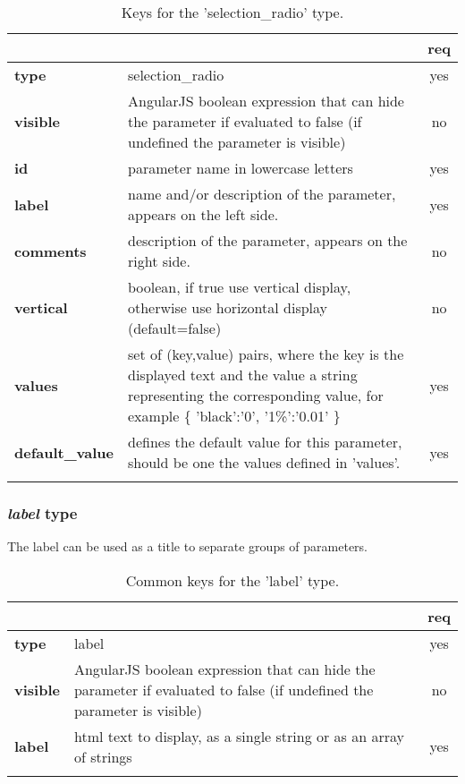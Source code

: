 \begin{longtable}{|>{\bf}L{\linewidth}|L{\linewidth}|c|}
\hline
      &  & {\bf req} 
\tabularnewline \hline \hline
 type     & selection\_radio    & yes \\ \hline
 visible  & AngularJS boolean expression that can hide the parameter if
            evaluated to false (if undefined the parameter is visible)& no \\ \hline
 id       & parameter name in lowercase letters & yes \\ \hline
 label  & name and/or description of the parameter, appears on the left side. & yes
                      \\ \hline
 comments & description of the parameter, appears on the right side. & no
                      \\ \hline
 vertical & boolean, if true use vertical display, otherwise use horizontal
            display (default=false) & no \\ \hline
 values   & set of (key,value) pairs, where the key is the displayed text and the 
value a string representing the corresponding value, for example \{ 
'black':'0', '1\%':'0.01' \} & yes
                      \\ \hline
 default\_value & defines the default value for this parameter, should be one 
the values defined in 'values'. & yes \\ \hline
\caption{Keys for the 'selection\_radio' type.}
\end{longtable}

\subsubsection{ \emph{label} type}

The label  can be used as a title to separate groups of parameters.

\begin{longtable}{|>{\bf}L{\linewidth}|L{\linewidth}|c|}
\hline
      &  & {\bf req} 
\tabularnewline \hline \hline
 type  & label       & yes \\ \hline
 visible  & AngularJS boolean expression that can hide the parameter if
            evaluated to false (if undefined the parameter is visible)& no \\ \hline
 label & html text to display, as a single string or as an array of strings& yes
                      \\ \hline
\caption{Common keys for the 'label' type.}
\end{longtable}


